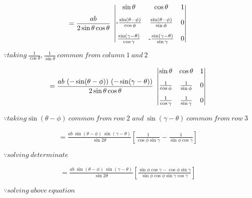 \documentclass[journal,12pt,twocolumn]{IEEEtran}
\begin{document}
\vspace{0.3cm}
\begin{multline}
=\frac{ab}{2 \sin\theta\cos\theta}~\begin{vmatrix}\vspace{0.3cm}
 {\sin\theta} & {\cos\theta} & 1  \\ \vspace{0.3cm}$-$
 \frac{\sin(\theta-\phi)}{\cos\phi} & \frac{\sin(\theta-\phi)}{\sin\phi} & 0  \\
 \frac{\sin(\gamma-\theta)}{\cos\gamma} &$-$ \frac{\sin(\gamma-\theta)}{\sin\gamma} & 0 
\end{vmatrix}    
\end{multline}
\begin{flushright}
$\because taking ~ \frac{1}{\cos\theta},\frac{1}{\sin\theta}~common ~from ~column~ 1 ~and~ 2$
\end{flushright}

\vspace{0.3cm}
\begin{multline}
=\frac{ab~(-\sin(\theta-\phi))~(-\sin(\gamma-\theta))}{2 \sin\theta\cos\theta}~\begin{vmatrix}\vspace{0.3cm}
 {\sin\theta} & {\cos\theta} & 1  \\ \vspace{0.3cm}
 \frac{1}{\cos\phi} & \frac{1}{\sin\phi} & 0  \\
 \frac{1}{\cos\gamma} & \frac{1}{\sin\gamma} & 0 
\end{vmatrix}    
\end{multline}
\begin{flushright}
$\because taking \sin(\theta-\phi)~common ~from ~row ~2$
$and~\sin(\gamma-\theta)~common ~from ~row ~3$
\end{flushright}

\vspace{0.3cm}
\begin{multline}
=\frac{ab~\sin(\theta-\phi)~\sin(\gamma-\theta)}{ \sin2\theta}\left[\frac{1}{\cos\phi\sin\gamma}-\frac{1}{\sin\phi\cos\gamma}
\right]
\end{multline}
\begin{flushright}
$\because solving~determinate $
\end{flushright}

\vspace{0.3cm}
\begin{multline}
=\frac{ab~\sin(\theta-\phi)~\sin(\gamma-\theta)}{ \sin2\theta}\left[\frac{\sin\phi\cos\gamma-\cos\phi\sin\gamma}{\sin\phi\cos\phi\sin\gamma\cos\gamma}
\right]
\end{multline}
\begin{flushright}
$\because solving ~above~equation $
\end{flushright}
\end{document}
